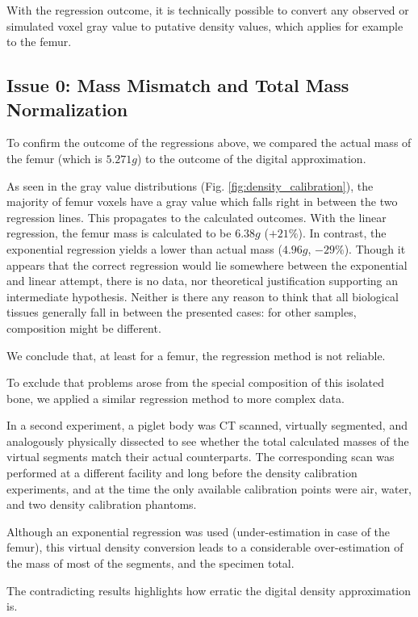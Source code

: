 With the regression outcome, it is technically possible to convert any observed or simulated voxel gray value to putative density values, which applies for example to the femur.


\subsection{Issue 0: Mass Mismatch and Total Mass Normalization}
\label{sec:org093f77b}

To confirm the outcome of the regressions above, we compared the actual mass of the femur (which is \(5.271 g\)) to the outcome of the digital approximation.

As seen in the gray value distributions (Fig. \ref{fig:density_calibration}), the majority of femur voxels have a gray value which falls right in between the two regression lines.
This propagates to the calculated outcomes.
With the linear regression, the femur mass is calculated to be \(6.38 g\) (\(+21 \%\)).
In contrast, the exponential regression yields a lower than actual mass (\(4.96 g\), \(-29 \%\)).
Though it appears that the correct regression would lie somewhere between the exponential and linear attempt, there is no data, nor theoretical justification supporting an intermediate hypothesis.
Neither is there any reason to think that all biological tissues generally fall in between the presented cases: for other samples, composition might be different.

We conclude that, at least for a femur, the regression method is not reliable.


To exclude that problems arose from the special composition of this isolated bone, we applied a similar regression method to more complex data.

In a second experiment, a piglet body was CT scanned, virtually segmented, and analogously physically dissected to see whether the total calculated masses of the virtual segments match their actual counterparts.
The corresponding scan was performed at a different facility and long before the density calibration experiments, and at the time the only available calibration points were air, water, and two density calibration phantoms.

Although an exponential regression was used (under-estimation in case of the femur), this virtual density conversion leads to a considerable over-estimation of the mass of most of the segments, and the specimen total.

The contradicting results highlights how erratic the digital density approximation is.



